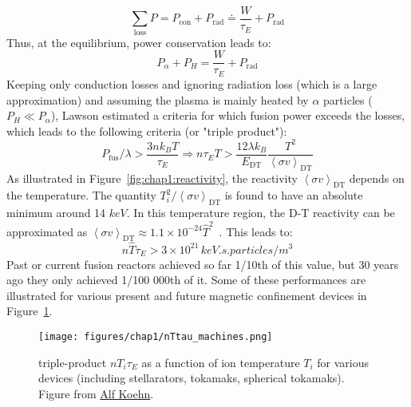 \begin{equation}
\sum_{\mathrm{loss}} P 
	=
	P_{\mathrm{con}} + P_{\mathrm{rad}}
	\doteq 
	\frac{ W }{ \tau_E } + P_{\mathrm{rad}}
	\label{eq:losses}
\end{equation}
Thus, at the equilibrium, power conservation leads to:
\begin{equation}
P_\alpha + P_{H} = \frac{ W }{ \tau_E } + P_{\mathrm{rad}}
\end{equation}
Keeping only conduction losses and ignoring radiation loss (which is a large approximation) and assuming the plasma is mainly heated by $\alpha$ particles ($P_H\ll P_\alpha$), Lawson estimated a criteria for which fusion power exceeds the losses, which leads to the following criteria (or "triple product"):
\begin{equation*}
	P_{\mathrm{fus}}/\lambda > \frac{3n k_B T}{\tau_E}
	\Rightarrow
	n \tau_E T > 
		\frac{12 \lambda k_B}{E_{\mathrm{DT}}} 
		\frac{T^2}{\left<\sigma v \right>_{\mathrm{DT}}}
\end{equation*}
As illustrated in Figure~\ref{fig:chap1:reactivity}, the reactivity $\left<\sigma v \right>_{\mathrm{DT}}$ depends on the temperature. The quantity $T_i^2 / \left<\sigma v \right>_{\mathrm{DT}}$ is found to have an absolute minimum around 14 $\si{keV}$. In this temperature region, the D-T reactivity can be approximated as $\left<\sigma v \right>_{\mathrm{DT}}\approx 1.1\times10^{-24} \hat{T}^2$~. 
This leads to:
\begin{equation}	
	n \hat{T} \tau_E > 3\times 10^{21} \, \si{keV.s.particles/m^3}
	\label{eq:lawson_criteria}
\end{equation}
Past or current fusion reactors achieved so far 1/10th of this value, but 30 years ago they only achieved 1/100 000th of it. Some of these performances are illustrated for various present and future magnetic confinement devices in Figure~\ref{fig:chap1:nTtau_machines}.



\begin{figure} 
	\begin{center}
		\texttt{[image: figures/chap1/nTtau\_machines.png]}
		\caption{triple-product $n T_i \tau_E$ as a function of ion temperature $T_i$ for various devices (including stellarators, tokamaks, spherical tokamaks). Figure from \href{https://github.com/alfkoehn/fusion_plots/releases/tag/v1.0.0}{Alf Koehn}.}
		\label{fig:chap1:nTtau_machines}
	\end{center}
\end{figure}



